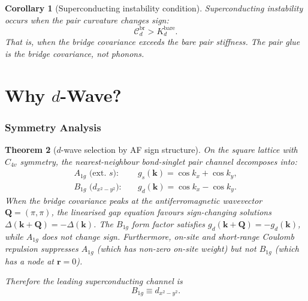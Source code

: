 \documentclass[12pt]{article}
\theoremstyle{plain}
\newtheorem{theorem}{Theorem}[section]
\newtheorem{corollary}[theorem]{Corollary}
\theoremstyle{definition}
\numberwithin{equation}{section}
\newcommand{\br}{\mathrm{br}}
\begin{document}
\begin{corollary}[Superconducting instability condition]
Superconducting instability occurs when the pair curvature
changes sign:
\begin{equation}
\boxed{\mathcal{C}_d^{\br} > K_d^{\mathrm{bare}}.}
\end{equation}
That is, when the bridge covariance exceeds the bare pair
stiffness.  The pair glue is the bridge covariance, not phonons.
\end{corollary}


\part{Why $d$-Wave?}

\section{Symmetry Analysis}\label{sec:symmetry}

\begin{theorem}[$d$-wave selection by AF sign structure]\label{thm:dwave}
On the square lattice with $C_{4v}$ symmetry, the nearest-neighbour
bond-singlet pair channel decomposes into:
\begin{align}
A_{1g}\text{ (ext.\ }s\text{)}: &\quad
g_s(\bm{k})=\cos k_x+\cos k_y,\\
B_{1g}\text{ (}d_{x^2-y^2}\text{)}: &\quad
g_d(\bm{k})=\cos k_x-\cos k_y.
\end{align}
When the bridge covariance peaks at the antiferromagnetic
wavevector $\bm{Q}=(\pi,\pi)$, the linearised gap equation
favours sign-changing solutions
$\Delta(\bm{k}+\bm{Q})=-\Delta(\bm{k})$.
The $B_{1g}$ form factor satisfies
$g_d(\bm{k}+\bm{Q})=-g_d(\bm{k})$,
while $A_{1g}$ does not change sign.  Furthermore, on-site and
short-range Coulomb repulsion suppresses $A_{1g}$ (which has
non-zero on-site weight) but not $B_{1g}$ (which has a node at
$\bm{r}=0$).

Therefore the leading superconducting channel is
\begin{equation}
\boxed{B_{1g}\equiv d_{x^2-y^2}.}
\end{equation}
\end{theorem}
\end{document}
